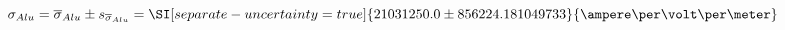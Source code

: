 
\begin{equation}
    \sigma_{Alu}
        = \overline{\sigma}_{Alu} \pm s_{\overline{\sigma}_{Alu}}
        = \SI[separate-uncertainty = true]{21031250.0 \pm 856224.181049733 }{\ampere\per\volt\per\meter}
\end{equation}